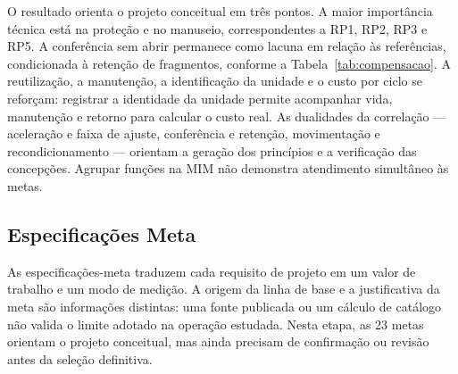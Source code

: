 O resultado orienta o projeto conceitual em três pontos. A maior importância técnica está na proteção e no manuseio, correspondentes a RP1, RP2, RP3 e RP5. A conferência sem abrir permanece como lacuna em relação às referências, condicionada à retenção de fragmentos, conforme a Tabela~\ref{tab:compensacao}. A reutilização, a manutenção, a identificação da unidade e o custo por ciclo se reforçam: registrar a identidade da unidade permite acompanhar vida, manutenção e retorno para calcular o custo real. As dualidades da correlação --- aceleração e faixa de ajuste, conferência e retenção, movimentação e recondicionamento --- orientam a geração dos princípios e a verificação das concepções. Agrupar funções na MIM não demonstra atendimento simultâneo às metas.


\subsection{Especificações Meta}

As especificações-meta traduzem cada requisito de projeto em um valor de trabalho e um modo de medição. A origem da linha de base e a justificativa da meta são informações distintas: uma fonte publicada ou um cálculo de catálogo não valida o limite adotado na operação estudada. Nesta etapa, as 23 metas orientam o projeto conceitual, mas ainda precisam de confirmação ou revisão antes da seleção definitiva.



